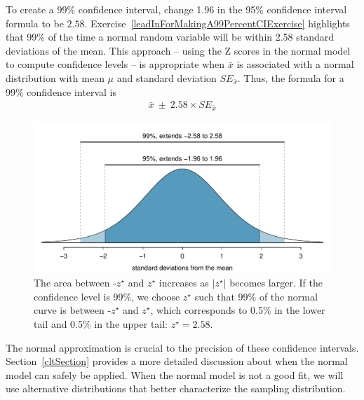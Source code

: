 To create a 99\% confidence interval, change 1.96 in the 95\% confidence interval formula to be $2.58$. Exercise~\ref{leadInForMakingA99PercentCIExercise} highlights that 99\% of the time a normal random variable will be within 2.58 standard deviations of the mean. This approach -- using the Z scores in the normal model to compute confidence levels -- is appropriate when $\bar{x}$ is associated with a normal distribution with mean $\mu$ and standard deviation $SE_{\bar{x}}$. Thus, the formula for a 99\% confidence interval is
\begin{eqnarray}
\bar{x}\ \pm\ 2.58\times SE_{\bar{x}}
\label{99PercCIForMean}
\end{eqnarray}

\begin{figure}[h]
\centering
\includegraphics[width=\textwidth]{ch_inference_foundations/figures/choosingZForCI/choosingZForCI}
\caption{The area between -$z^{\star}$ and $z^{\star}$ increases as $|z^{\star}|$ becomes larger. If the confidence level is 99\%, we choose $z^{\star}$ such that 99\% of the normal curve is between -$z^{\star}$ and $z^{\star}$, which corresponds to 0.5\% in the lower tail and 0.5\% in the upper tail: $z^{\star}=2.58$.}
\label{choosingZForCI}
\end{figure}

The normal approximation is crucial to the precision of these confidence intervals. Section~\ref{cltSection} provides a more detailed discussion about when the normal model can safely be applied. When the normal model is not a good fit, we will use alternative distributions that better characterize the sampling distribution.

